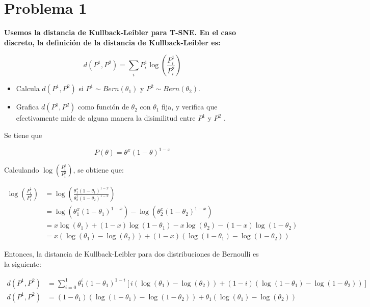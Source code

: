 \section*{Problema 1}

\textbf{Usemos la distancia de Kullback-Leibler para T-SNE. En el caso discreto, la definición de la distancia de Kullback-Leibler es:}

\begin{equation*}
    d(P^1,P^2) = \sum_i P^1_i \log \left (\frac{P^1_i}{P^2_i} \right )
\end{equation*}

\begin{itemize}
    \item Calcula $d(P^1,P^2)$ si $P^1\sim Bern(\theta_1)$ y $P^2 \sim Bern(\theta_2)$.
    \item Grafica $d(P^1 , P^2)$ como función de $\theta_2$ con $\theta_1$ fija, y verifica que efectivamente mide de alguna manera la disimilitud entre $P^1$ y $P^2$ .
\end{itemize}

Se tiene que

\begin{equation*}
    P(\theta) = \theta^x (1-\theta)^{1-x}
\end{equation*}

Calculando $ \log \left (\frac{P^1_i}{P^2_i} \right )$, se obtiene que:

\begin{align*}
    \log \left (\frac{P^1_i}{P^2_i} \right ) & = \log \left (\frac{\theta_1^x (1-\theta_1)^{1-x}}{\theta_2^x (1-\theta_2)^{1-x}} \right )                   \\
                                             & = \log \left (\theta_1^x (1-\theta_1)^{1-x} \right ) - \log \left (\theta_2^x (1-\theta_2)^{1-x}\right )     \\
                                             & = x \log (\theta_1) + (1-x) \log (1-\theta_1) -x \log (\theta_2) - (1-x) \log (1-\theta_2)                   \\
                                             & = x \left(\log (\theta_1)-\log (\theta_2)\right) + (1-x) \left (\log (1-\theta_1)-\log (1-\theta_2) \right )
\end{align*}

Entonces, la distancia de Kullback-Leibler para dos distribuciones de Bernoulli es la siguiente:

\begin{align*}
    d(P^1,P^2) & = \sum_{i=0}^1 \theta_1^i (1-\theta_1)^{1-i}\left [ i \left(\log (\theta_1)-\log (\theta_2)\right) + (1-i) \left (\log (1-\theta_1)-\log (1-\theta_2) \right ) \right ] \\
    d(P^1,P^2) & = (1-\theta_1) \left ( \log (1-\theta_1)- \log (1-\theta_2)\right ) + \theta_1 \left (\log (\theta_1)-\log (\theta_2) \right )
\end{align*}